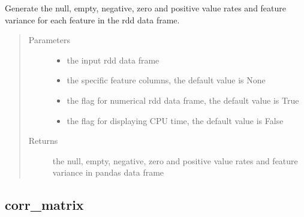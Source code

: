 \documentclass[letterpaper,12pt,english]{sphinxmanual}
\begin{document}
\begin{fulllineitems}
Generate the null, empty, negative, zero and  positive value rates and feature variance for
each feature in the rdd data frame.
\begin{quote}\begin{description}
\item[{Parameters}] \leavevmode\begin{itemize}
\item {} 
 \textendash{} the input rdd data frame

\item {} 
 \textendash{} the specific feature columns, the default value is None

\item {} 
 \textendash{} the flag for numerical rdd data frame, the default value is True

\item {} 
 \textendash{} the flag for displaying CPU time, the default value is False

\end{itemize}

\item[{Returns}] \leavevmode
the null, empty, negative, zero and  positive value rates and feature variance
in pandas data frame

\end{description}\end{quote}

\end{fulllineitems}



\subsection{corr\_matrix}
\label{\detokenize{basics:corr-matrix}}
\end{document}
